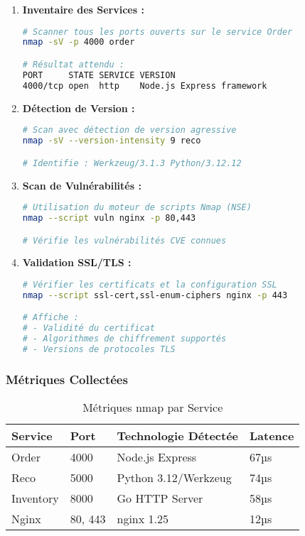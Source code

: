 \begin{enumerate}
    \item \textbf{Inventaire des Services :}
    \begin{lstlisting}[language=bash, caption=Scan de Base des Services]
# Scanner tous les ports ouverts sur le service Order
nmap -sV -p 4000 order

# Résultat attendu :
PORT     STATE SERVICE VERSION
4000/tcp open  http    Node.js Express framework
    \end{lstlisting}
    
    \item \textbf{Détection de Version :}
    \begin{lstlisting}[language=bash, caption=Détection Détaillée des Versions]
# Scan avec détection de version agressive
nmap -sV --version-intensity 9 reco

# Identifie : Werkzeug/3.1.3 Python/3.12.12
    \end{lstlisting}
    
    \item \textbf{Scan de Vulnérabilités :}
    \begin{lstlisting}[language=bash, caption=Scan de Vulnérabilités avec Scripts NSE]
# Utilisation du moteur de scripts Nmap (NSE)
nmap --script vuln nginx -p 80,443

# Vérifie les vulnérabilités CVE connues
    \end{lstlisting}
    
    \item \textbf{Validation SSL/TLS :}
    \begin{lstlisting}[language=bash, caption=Analyse des Certificats SSL]
# Vérifier les certificats et la configuration SSL
nmap --script ssl-cert,ssl-enum-ciphers nginx -p 443

# Affiche :
# - Validité du certificat
# - Algorithmes de chiffrement supportés
# - Versions de protocoles TLS
    \end{lstlisting}
\end{enumerate}

\subsubsection{Métriques Collectées}
\begin{table}[H]
\centering
\caption{Métriques nmap par Service}
\label{tab:nmap_metrics}
\begin{tabular}{|l|l|l|l|}
\hline
\textbf{Service} & \textbf{Port} & \textbf{Technologie Détectée} & \textbf{Latence} \\
\hline
Order & 4000 & Node.js Express & 67µs \\
Reco & 5000 & Python 3.12/Werkzeug & 74µs \\
Inventory & 8000 & Go HTTP Server & 58µs \\
Nginx & 80, 443 & nginx 1.25 & 12µs \\
\hline
\end{tabular}
\end{table}

